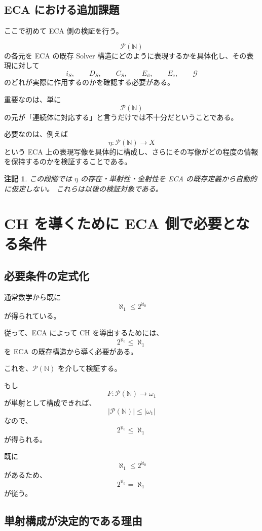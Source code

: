 \documentclass[a4paper,11pt]{article}
\newtheorem{remark}[definition]{注記}
\newcommand{\N}{\mathbb{N}}
\newcommand{\Pow}{\mathcal{P}}
\begin{document}
\subsection{ECA における追加課題}

ここで初めて ECA 側の検証を行う。

\[
\Pow(\N)
\]
の各元を ECA の既存 Solver 構造にどのように表現するかを具体化し、その表現に対して
\[
i_S,\qquad D_S,\qquad C_S,\qquad
E_{\mathrm{d}},\qquad E_{\mathrm c},\qquad \mathcal G
\]
のどれが実際に作用するのかを確認する必要がある。

重要なのは、単に
\[
\Pow(\N)
\]
の元が「連続体に対応する」と言うだけでは不十分だということである。

必要なのは、例えば
\[
\eta:\Pow(\N)\longrightarrow X
\]
という ECA 上の表現写像を具体的に構成し、さらにその写像がどの程度の情報を保持するのかを検証することである。

\begin{remark}
この段階では $\eta$ の存在・単射性・全射性を ECA の既存定義から自動的に仮定しない。
これらは以後の検証対象である。
\end{remark}

\section{CH を導くために ECA 側で必要となる条件}

\subsection{必要条件の定式化}

通常数学から既に
\[
\aleph_1\leq2^{\aleph_0}
\]
が得られている。

従って、ECA によって CH を導出するためには、
\[
\boxed{
2^{\aleph_0}\leq\aleph_1
}
\]
を ECA の既存構造から導く必要がある。

これを、$\Pow(\N)$ を介して検証する。

もし
\[
F:\Pow(\N)\longrightarrow\omega_1
\]
が単射として構成できれば、
\[
|\Pow(\N)|\leq|\omega_1|
\]
なので、
\[
2^{\aleph_0}\leq\aleph_1
\]
が得られる。

既に
\[
\aleph_1\leq2^{\aleph_0}
\]
があるため、
\[
\boxed{
2^{\aleph_0}=\aleph_1
}
\]
が従う。

\subsection{単射構成が決定的である理由}
\end{document}
